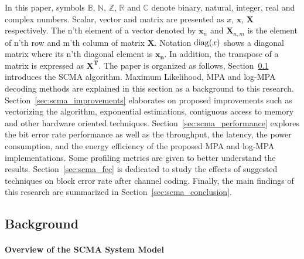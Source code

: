 In this paper, symbols $\mathbb{B}$, $\mathbb{N}$, $\mathbb{Z}$, $\mathbb{R}$
and $\mathbb{C}$ denote binary, natural, integer, real and complex numbers.
Scalar, vector and matrix are presented as $x$, $\bm{x}$, $\bm{X}$ respectively.
The n'th element of a vector denoted by $\bm{x}_n$ and $\bm{X}_{n,m}$ is the
element of n'th row and m'th column of matrix $\bm{X}$. Notation $\operatorname{diag}(x)$
shows a diagonal matrix where its n'th diagonal element is $\bm{x_n}$. In
addition, the transpose of a matrix is expressed as $\bm{X^T}$. The paper is
organized as follows, Section~\ref{sec:scma_background} introduces the SCMA
algorithm. Maximum Likelihood, MPA and log-MPA decoding methods are explained in
this section as a background to this research.
Section~\ref{sec:scma_improvements} elaborates on proposed improvements such as
vectorizing the algorithm, exponential estimations, contiguous access to memory
and other hardware oriented techniques. Section~\ref{sec:scma_performance}
explores the bit error rate performance as well as the throughput, the latency,
the power consumption, and the energy efficiency of the proposed MPA and log-MPA
implementations. Some profiling metrics are given to better understand the
results. Section~\ref{sec:scma_fec} is dedicated to study the effects of
suggested techniques on block error rate after channel coding. Finally, the main
findings of this research are summarized in Section~\ref{sec:scma_conclusion}.

\subsection{Background}
\label{sec:scma_background}

\paragraph{Overview of the SCMA System Model}
\label{sec:scma_overview}

